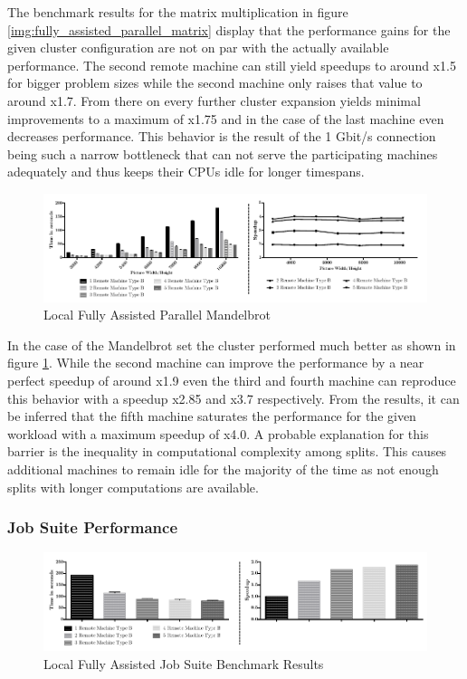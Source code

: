 The benchmark results for the matrix multiplication in figure \ref{img:fully_assisted_parallel_matrix} display that the performance gains for the given cluster configuration are not on par with the actually available performance. The second remote machine can still yield speedups to around x1.5 for bigger problem sizes while the second machine only raises that value to around x1.7. From there on every further cluster expansion yields minimal improvements to a maximum of x1.75 and in the case of the last machine even decreases performance. This behavior is the result of the 1 Gbit/s connection being such a narrow bottleneck that can not serve the participating machines adequately and thus keeps their CPUs idle for longer timespans.

\begin{figure}[!htb]

	\includegraphics[width=1.0\textwidth]{images/local_fully_assisted_mandelbrot.pdf}
	\centering
	\caption{Local Fully Assisted Parallel Mandelbrot}
	\label{img:fully_assisted_parallel_mandelbrot}
\end{figure}

In the case of the Mandelbrot set the cluster performed much better as shown in figure \ref{img:fully_assisted_parallel_mandelbrot}. While the second machine can improve the performance by a near perfect speedup of around x1.9 even the third and fourth machine can reproduce this behavior with a speedup x2.85 and x3.7 respectively. From the results, it can be inferred that the fifth machine saturates the performance for the given workload with a maximum speedup of x4.0. A probable explanation for this barrier is the inequality in computational complexity among splits. This causes additional machines to remain idle for the majority of the time as not enough splits with longer computations are available.

\subsubsection*{Job Suite Performance}

\begin{figure}[!htb]

	\includegraphics[width=1.0\textwidth]{images/local_fully_assisted_full_benchmark.pdf}
	\centering
	\caption{Local Fully Assisted Job Suite Benchmark Results}
	\label{img:local_fully_assisted_benchmark_results}
\end{figure}

